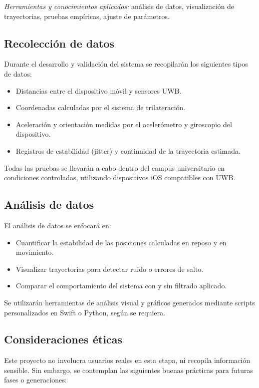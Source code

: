 \documentclass{article}
\begin{document}
\textit{Herramientas y conocimientos aplicados:} análisis de datos, visualización de trayectorias, pruebas empíricas, ajuste de parámetros.

\subsection{Recolección de datos}

Durante el desarrollo y validación del sistema se recopilarán los siguientes tipos de datos:

\begin{itemize}
    \item Distancias entre el dispositivo móvil y sensores UWB.
    \item Coordenadas calculadas por el sistema de trilateración.
    \item Aceleración y orientación medidas por el acelerómetro y giroscopio del dispositivo.
    \item Registros de estabilidad (jitter) y continuidad de la trayectoria estimada.
\end{itemize}

Todas las pruebas se llevarán a cabo dentro del campus universitario en condiciones controladas, utilizando dispositivos iOS compatibles con UWB.

\subsection{Análisis de datos}

El análisis de datos se enfocará en:

\begin{itemize}
    \item Cuantificar la estabilidad de las posiciones calculadas en reposo y en movimiento.
    \item Visualizar trayectorias para detectar ruido o errores de salto.
    \item Comparar el comportamiento del sistema con y sin filtrado aplicado.
\end{itemize}

Se utilizarán herramientas de análisis visual y gráficos generados mediante scripts personalizados en Swift o Python, según se requiera.

\subsection{Consideraciones éticas}

Este proyecto no involucra usuarios reales en esta etapa, ni recopila información sensible. Sin embargo, se contemplan las siguientes buenas prácticas para futuras fases o generaciones:
\end{document}
